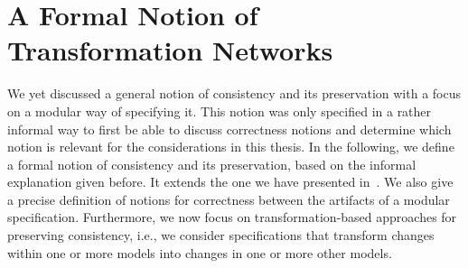 \section{A Formal Notion of Transformation Networks}
\label{chap:correctness:formalization}

We yet discussed a general notion of consistency and its preservation with a focus on a modular way of specifying it.
This notion was only specified in a rather informal way to first be able to discuss correctness notions and determine which notion is relevant for the considerations in this thesis.
In the following, we define a formal notion of consistency and its preservation, based on the informal explanation given before.
It extends the one we have presented in~.
We also give a precise definition of notions for correctness between the artifacts of a modular specification.
Furthermore, we now focus on transformation-based approaches for preserving consistency, i.e., we consider specifications that transform changes within one or more models into changes in one or more other models.

